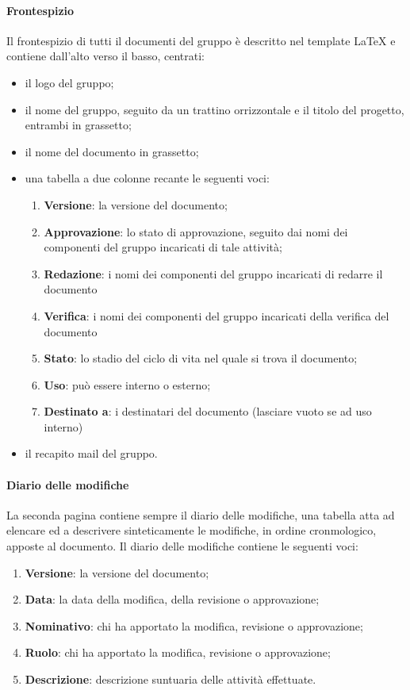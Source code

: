 	    \paragraph{Frontespizio}
	    Il frontespizio di tutti il documenti del gruppo è descritto nel template LaTeX e contiene dall'alto verso il basso, centrati:
	    \begin{itemize}
	        \item il logo del gruppo;
	        \item il nome del gruppo, seguito da un trattino orrizzontale e il titolo del progetto, entrambi in grassetto;
	        \item il nome del documento in grassetto;
	        \item una tabella a due colonne recante le seguenti voci:
	        \begin{enumerate}
	            \item \textbf{Versione}: la versione del documento;
	            \item \textbf{Approvazione}: lo stato di approvazione, seguito dai nomi dei componenti del gruppo incaricati di tale attività;
	            \item \textbf{Redazione}: i nomi dei componenti del gruppo incaricati di redarre il documento
	            \item \textbf{Verifica}: i nomi dei componenti del gruppo incaricati della verifica del documento
	            \item \textbf{Stato}: lo stadio del ciclo di vita nel quale si trova il documento;
	            \item \textbf{Uso}: può essere interno o esterno;
	            \item \textbf{Destinato a}: i destinatari del documento (lasciare vuoto se ad uso interno)
	        \end{enumerate}
	        \item il recapito mail del gruppo.
	    \end{itemize}
	    \paragraph{Diario delle modifiche}
	    La seconda pagina contiene sempre il diario delle modifiche, una tabella atta ad elencare ed a descrivere sinteticamente le modifiche, in ordine cronmologico, apposte al documento.
	    Il diario delle modifiche contiene le seguenti voci:
	    \begin{enumerate}
	        \item \textbf{Versione}: la versione del documento;
	        \item \textbf{Data}: la data della modifica, della revisione o approvazione;
	        \item \textbf{Nominativo}: chi ha apportato la modifica, revisione o approvazione;
	        \item \textbf{Ruolo}: chi ha apportato la modifica, revisione o approvazione;
	        \item \textbf{Descrizione}: descrizione suntuaria delle attività effettuate.
	    \end{enumerate}
